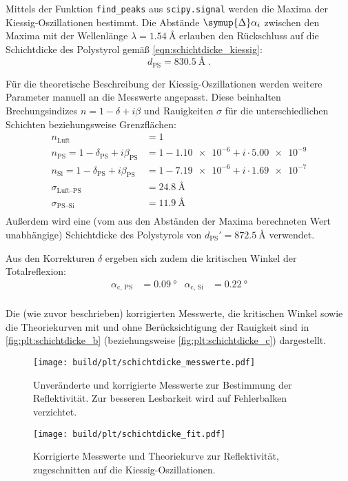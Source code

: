 Mittels der Funktion \texttt{find\_peaks} aus \texttt{scipy.signal} werden die Maxima der Kiessig-Oszillationen bestimmt.
Die Abstände $\symup{\Delta} \alpha_i$ zwischen den Maxima
mit der Wellenlänge $\lambda = \SI{1.54}{\angstrom}$
erlauben den Rückschluss auf die Schichtdicke des Polystyrol gemäß \autoref{eqn:schichtdicke_kiessig}:
\[
    d_\text{PS} = \SI{830.5}{\angstrom} \; .
\]

Für die theoretische Beschreibung der Kiessig-Oszillationen werden weitere Parameter manuell an die Messwerte angepasst.
Diese beinhalten Brechungsindizes $n = 1 - \delta + i\beta$ und Rauigkeiten $\sigma$
für die unterschiedlichen Schichten beziehungsweise Grenzflächen:
\begin{align*}
    n_\text{Luft} &= 1 \\
    n_\text{PS} = 1 - \delta_\text{PS} + i \beta_\text{PS} &= 1 - \num{1.10e-6} + i \cdot \num{5.00e-9} \\
    n_\text{Si} = 1 - \delta_\text{PS} + i \beta_\text{PS} &= 1 - \num{7.19e-6} + i \cdot \num{1.69e-7} \\
    \sigma_\text{Luft–PS} &= \SI{24.8}{\angstrom} \\
    \sigma_\text{PS–Si} &= \SI{11.9}{\angstrom} \\
\end{align*}
Außerdem wird eine (vom aus den Abständen der Maxima berechneten Wert unabhängige) Schichtdicke des Polystyrols von
$d_\text{PS}' = \SI{872.5}{\angstrom}$ verwendet.

Aus den Korrekturen $\delta$ ergeben sich zudem die kritischen Winkel der Totalreflexion:
\begin{align*}
    \alpha_\text{c, PS} &= \SI{0.09}{\degree}
    &
    \alpha_\text{c, Si} &= \SI{0.22}{\degree} \\
\end{align*}

Die (wie zuvor beschrieben) korrigierten Messwerte,
die kritischen Winkel
sowie die Theoriekurven mit und ohne Berücksichtigung der Rauigkeit
sind in \autoref{fig:plt:schichtdicke_b}
    (beziehungsweise \autoref{fig:plt:schichtdicke_c})
dargestellt.


\begin{figure}
    \centering
    \texttt{[image: build/plt/schichtdicke\_messwerte.pdf]}
    \caption{
        Unveränderte und korrigierte Messwerte zur Bestimmung der Reflektivität.
        Zur besseren Lesbarkeit wird auf Fehlerbalken verzichtet.
    }
    \label{fig:plt:schichtdicke_a}
\end{figure}
\begin{figure}
    \centering
    \texttt{[image: build/plt/schichtdicke\_fit.pdf]}
    \caption{
        Korrigierte Messwerte und Theoriekurve zur Reflektivität,
        zugeschnitten auf die Kiessig-Oszillationen.
    }
    \label{fig:plt:schichtdicke_b}
\end{figure}

